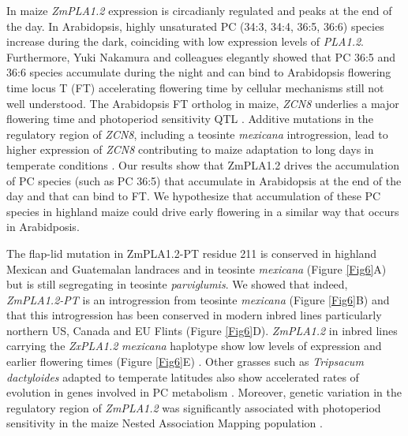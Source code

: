 \documentclass[9pt,twocolumn,twoside,lineno]{BioRxiv}
\begin{document}
In maize \textit{ZmPLA1.2} expression is circadianly regulated\cite{Khan2010-iv} and peaks at the end of the day. 
In Arabidopsis, highly unsaturated PC (34:3, 34:4, 36:5, 36:6) species increase during the dark\cite{Maatta2012-ip}, coinciding with low expression levels of \textit{PLA1.2}\cite{Khan2010-iv}.
Furthermore, Yuki Nakamura and colleagues elegantly showed that PC 36:5 and 36:6 species accumulate during the night and can bind to Arabidopsis flowering time locus T (FT) accelerating flowering time \cite{Nakamura2014-qf} by cellular mechanisms still not well understood. 
The Arabidopsis FT ortholog in maize, \textit{ZCN8} \cite{Lazakis2011-nq} underlies a major flowering time and photoperiod sensitivity QTL \cite{Hung2012-ms}.
Additive mutations in the regulatory region of \textit{ZCN8}, including a teosinte \textit{mexicana} introgression, lead to higher expression of \textit{ZCN8} contributing to maize adaptation to long days in temperate conditions \cite{Guo2019-pn}.
Our results show that ZmPLA1.2 drives the accumulation of PC species (such as PC 36:5) that accumulate in Arabidopsis at the end of the day and that can bind to FT. 
We hypothesize that accumulation of these PC species in highland maize could drive early flowering in a similar way that occurs in Arabidposis. 

The flap-lid mutation in ZmPLA1.2-PT residue 211 is conserved in highland Mexican and Guatemalan landraces and in teosinte \textit{mexicana} (Figure \ref{Fig6}A) but is still segregating in teosinte \textit{parviglumis}. 
We showed that indeed, \textit{ZmPLA1.2-PT} is an introgression from teosinte \textit{mexicana} (Figure \ref{Fig6}B) and that this introgression has been conserved in modern inbred lines particularly northern US, Canada and EU Flints (Figure \ref{Fig6}D). 
\textit{ZmPLA1.2} in inbred lines carrying the \textit{ZxPLA1.2} \textit{mexicana} haplotype show low levels of expression and earlier flowering times (Figure \ref{Fig6}E) \cite{Kremling2018-gn}. 
Other grasses such as \textit{Tripsacum dactyloides} adapted to temperate latitudes also show accelerated rates of evolution in genes involved in PC metabolism \cite{Yan2019-tx}.
Moreover, genetic variation in the regulatory region of \textit{ZmPLA1.2} was significantly associated with photoperiod sensitivity in the maize Nested Association Mapping population \cite{Hung2012-ms}. 
\end{document}
